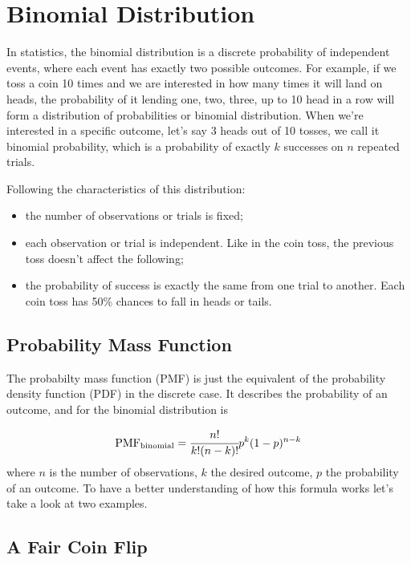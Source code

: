 \chapter{Binomial Distribution}\label{binomial-distribution}

In statistics, the binomial distribution is a discrete probability of
independent events, where each event has exactly two possible outcomes.
For example, if we toss a coin 10 times and we are interested in how
many times it will land on heads, the probability of it lending one,
two, three, up to 10 head in a row will form a distribution of
probabilities or binomial distribution. When we're interested in a
specific outcome, let's say 3 heads out of 10 tosses, we call it
binomial probability, which is a probability of exactly \(k\) successes
on \(n\) repeated trials.

Following the characteristics of this distribution:

\begin{itemize}
\tightlist
\item
  the number of observations or trials is fixed;
\item
  each observation or trial is independent. Like in the coin toss, the
  previous toss doesn't affect the following;
\item
  the probability of success is exactly the same from one trial to
  another. Each coin toss has 50\% chances to fall in heads or tails.
\end{itemize}

\section{Probability Mass Function}\label{probability-mass-function}

The probabilty mass function (PMF) is just the equivalent of the
probability density function (PDF) in the discrete case. It describes the
probability of an outcome, and for the binomial distribution is

\[ \mathrm{PMF}_{\mathrm{binomial}} = \cfrac{n!}{k!(n-k)!}p^k (1-p)^{n-k}\]
where \(n\) is the number of observations, \(k\) the desired outcome,
\(p\) the probability of an outcome. To have a better understanding of
how this formula works let's take a look at two examples.

\section{A Fair Coin Flip}\label{a-fair-coin-flip}

